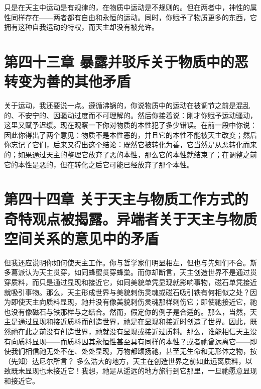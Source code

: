 只是在天主中运动是有规律的，在物质中运动是不规则的。但在两者中，神性的属性同样存在——两者都有自由和永恒的运动。同时，你赋予了物质更多的东西，它拥有这种自我运动的特权，而天主却没有被允许。\par


\section{第四十三章 暴露并驳斥关于物质中的恶转变为善的其他矛盾}

关于运动，我还要说一点。遵循沸锅的，你说物质中的运动在被调节之前是混乱的、不安宁的、因骚动过度而不可理解的。然后你接着说：刚才你赋予运动骚动，这里又赋予迟缓。现在观察一下你对物质的本性犯了多少错误。在前一段中你说：因此你得出了两个意见：物质不是本性恶的，并且它的本性不能被天主改变；然后你忘记了它们，后来又得出这个结论：既然它被转化为善，它当然是从恶转化而来的；如果通过天主的整理它放弃了恶的本性，那么它的本性就结束了；在调整之前它的本性是恶的，但在转化之后它可能已经放弃了那个本性。\par


\section{第四十四章 关于天主与物质工作方式的奇特观点被揭露。异端者关于天主与物质空间关系的意见中的矛盾}

但我还应说明你如何使天主工作。你与哲学家们明显相左，但也与先知们不合。斯多葛派认为天主贯穿，如同蜂蜜贯穿蜂巢。而你却断言，天主创造世界不是通过贯穿质料，而只是通过显现和接近它，如同美貌单凭显现就影响事物，磁石单凭接近就吸引事物。那么，天主形成世界与美貌刺伤灵魂或磁石吸引铁有何相似之处？因为即使天主向质料显现，祂并没有像美貌刺伤灵魂那样刺伤它；即使祂接近它，祂也没有像磁石与铁那样与之结合。然而，假定你的例子是合适的。那么，当然，天主是通过显现和接近质料而创造世界，祂是在显现和接近时创造了世界。因此，既然祂在此之前没有创造世界，祂就没有显现或接近过质料。那么，谁能相信天主没有向质料显现——而质料因其永恒性甚至具有同样的本性？或者祂曾远离它——即使我们相信祂无处不在、处处显现，万物都颂扬祂，甚至无生命和无形体之物，按（先知）达尼尔所言？ 多么浩大的地方，天主在创造世界之前如此远离质料，以致既未显现也未接近它！我想，祂是从遥远的地方旅行到它那里，一旦祂愿意显现和接近它。\par


